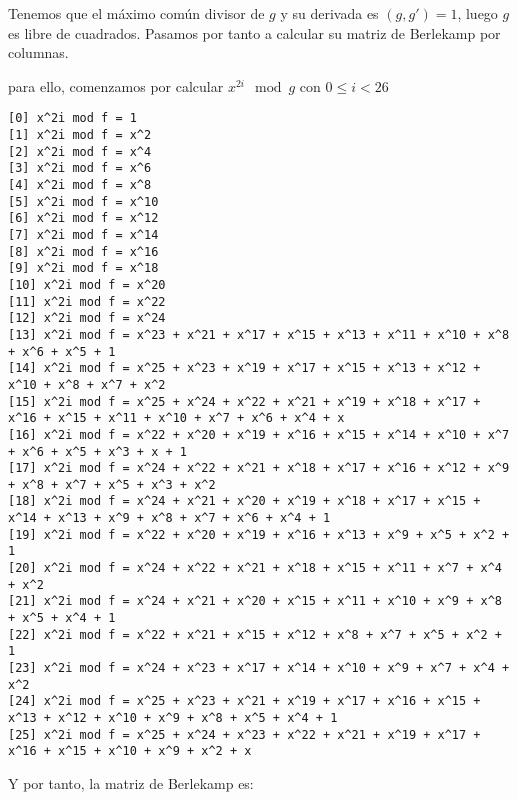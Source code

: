 \documentclass[a4paper]{article}
\begin{document}
Tenemos que el máximo común divisor de $g$ y su derivada es $(g, g')=1$, luego $g$ es libre de cuadrados. Pasamos por tanto a calcular su matriz de Berlekamp por columnas.

para ello, comenzamos por calcular $x^{2i} \mod g$ con $0\leq i < 26$

\begin{verbatim}
[0] x^2i mod f = 1
[1] x^2i mod f = x^2
[2] x^2i mod f = x^4
[3] x^2i mod f = x^6
[4] x^2i mod f = x^8
[5] x^2i mod f = x^10
[6] x^2i mod f = x^12
[7] x^2i mod f = x^14
[8] x^2i mod f = x^16
[9] x^2i mod f = x^18
[10] x^2i mod f = x^20
[11] x^2i mod f = x^22
[12] x^2i mod f = x^24
[13] x^2i mod f = x^23 + x^21 + x^17 + x^15 + x^13 + x^11 + x^10 + x^8 + x^6 + x^5 + 1
[14] x^2i mod f = x^25 + x^23 + x^19 + x^17 + x^15 + x^13 + x^12 + x^10 + x^8 + x^7 + x^2
[15] x^2i mod f = x^25 + x^24 + x^22 + x^21 + x^19 + x^18 + x^17 + x^16 + x^15 + x^11 + x^10 + x^7 + x^6 + x^4 + x
[16] x^2i mod f = x^22 + x^20 + x^19 + x^16 + x^15 + x^14 + x^10 + x^7 + x^6 + x^5 + x^3 + x + 1
[17] x^2i mod f = x^24 + x^22 + x^21 + x^18 + x^17 + x^16 + x^12 + x^9 + x^8 + x^7 + x^5 + x^3 + x^2
[18] x^2i mod f = x^24 + x^21 + x^20 + x^19 + x^18 + x^17 + x^15 + x^14 + x^13 + x^9 + x^8 + x^7 + x^6 + x^4 + 1
[19] x^2i mod f = x^22 + x^20 + x^19 + x^16 + x^13 + x^9 + x^5 + x^2 + 1
[20] x^2i mod f = x^24 + x^22 + x^21 + x^18 + x^15 + x^11 + x^7 + x^4 + x^2
[21] x^2i mod f = x^24 + x^21 + x^20 + x^15 + x^11 + x^10 + x^9 + x^8 + x^5 + x^4 + 1
[22] x^2i mod f = x^22 + x^21 + x^15 + x^12 + x^8 + x^7 + x^5 + x^2 + 1
[23] x^2i mod f = x^24 + x^23 + x^17 + x^14 + x^10 + x^9 + x^7 + x^4 + x^2
[24] x^2i mod f = x^25 + x^23 + x^21 + x^19 + x^17 + x^16 + x^15 + x^13 + x^12 + x^10 + x^9 + x^8 + x^5 + x^4 + 1
[25] x^2i mod f = x^25 + x^24 + x^23 + x^22 + x^21 + x^19 + x^17 + x^16 + x^15 + x^10 + x^9 + x^2 + x
\end{verbatim}

Y por tanto, la matriz de Berlekamp es:
\end{document}
